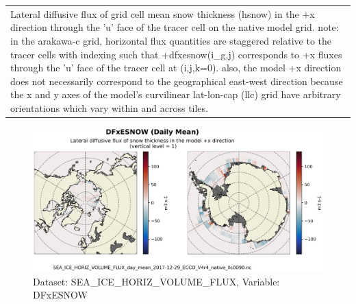 \begin{longtable}{|m{}|m{}|m{}|m{}|}
\rowcolor{lightgray} \multicolumn{4}{|c|}{\textbf{Comments}} \\ \hline
\multicolumn{4}{|p{1\textwidth}|}{\footnotesize{{Lateral diffusive flux of grid cell mean snow thickness (hsnow) in the +x direction through the 'u' face of the tracer cell on the native model grid. note: in the arakawa-c grid, horizontal flux quantities are staggered relative to the tracer cells with indexing such that +dfxesnow(i\_g,j) corresponds to +x fluxes through the 'u' face of the tracer cell at (i,j,k=0). also, the model +x direction does not necessarily correspond to the geographical east-west direction because the x and y axes of the model's curvilinear lat-lon-cap (llc) grid have arbitrary orientations which vary within and across tiles.}}} \\ \hline
\end{longtable}

\begin{figure}[H]
\centering
\includegraphics[scale=0.55]{../images/plots/native_plots/Sea-Ice_and_Snow_Horizontal_Volume_Fluxes/DFxESNOW.png}
\caption{Dataset: SEA\_ICE\_HORIZ\_VOLUME\_FLUX, Variable: DFxESNOW}
\label{tab:table-SEA_ICE_HORIZ_VOLUME_FLUX_DFxESNOW-Plot}
\end{figure}
\newpage
\pagebreak
